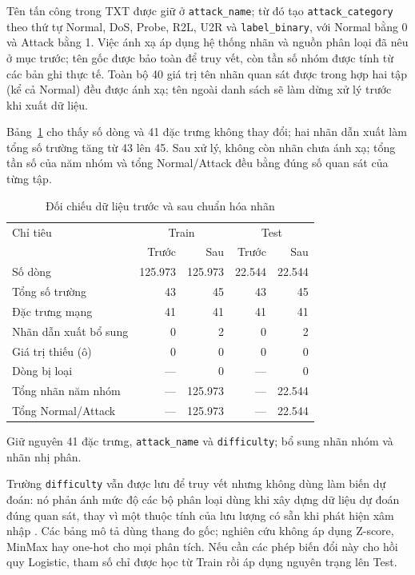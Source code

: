 Tên tấn công trong TXT được giữ ở \texttt{attack\_name}; từ đó tạo \texttt{attack\_category} theo thứ tự Normal, DoS, Probe, R2L, U2R và \texttt{label\_binary}, với Normal bằng 0 và Attack bằng 1. Việc ánh xạ áp dụng hệ thống nhãn và nguồn phân loại đã nêu ở mục trước; tên gốc được bảo toàn để truy vết, còn tần số nhóm được tính từ các bản ghi thực tế. Toàn bộ 40 giá trị tên nhãn quan sát được trong hợp hai tập (kể cả Normal) đều được ánh xạ; tên ngoài danh sách sẽ làm dừng xử lý trước khi xuất dữ liệu.

Bảng~\ref{tab:t2:beforeafter} cho thấy số dòng và 41 đặc trưng không thay đổi; hai nhãn dẫn xuất làm tổng số trường tăng từ 43 lên 45. Sau xử lý, không còn nhãn chưa ánh xạ; tổng tần số của năm nhóm và tổng Normal/Attack đều bằng đúng số quan sát của từng tập.
\begin{table}[H]
\centering
\caption{Đối chiếu dữ liệu trước và sau chuẩn hóa nhãn}
\label{tab:t2:beforeafter}
\small
\setlength{\tabcolsep}{3pt}
\begin{tabular}{p{7.5cm}rrrr}
\toprule
Chỉ tiêu & \multicolumn{2}{c}{Train} & \multicolumn{2}{c}{Test} \\ & Trước & Sau & Trước & Sau \\
\midrule
Số dòng & 125.973 & 125.973 & 22.544 & 22.544 \\
Tổng số trường & 43 & 45 & 43 & 45 \\
Đặc trưng mạng & 41 & 41 & 41 & 41 \\
Nhãn dẫn xuất bổ sung & 0 & 2 & 0 & 2 \\
Giá trị thiếu (ô) & 0 & 0 & 0 & 0 \\
Dòng bị loại & --- & 0 & --- & 0 \\
Tổng nhãn năm nhóm & --- & 125.973 & --- & 22.544 \\
Tổng Normal/Attack & --- & 125.973 & --- & 22.544 \\
\bottomrule
\end{tabular}
\par\smallskip\footnotesize Giữ nguyên 41 đặc trưng, \texttt{attack\_name} và \texttt{difficulty}; bổ sung nhãn nhóm và nhãn nhị phân.
\end{table}
Trường \texttt{difficulty} vẫn được lưu để truy vết nhưng không dùng làm biến dự đoán: nó phản ánh mức độ các bộ phân loại dùng khi xây dựng dữ liệu dự đoán đúng quan sát, thay vì một thuộc tính của lưu lượng có sẵn khi phát hiện xâm nhập \cite{task2_unb2009}. Các bảng mô tả dùng thang đo gốc; nghiên cứu không áp dụng Z-score, MinMax hay one-hot cho mọi phân tích. Nếu cần các phép biến đổi này cho hồi quy Logistic, tham số chỉ được học từ Train rồi áp dụng nguyên trạng lên Test.

